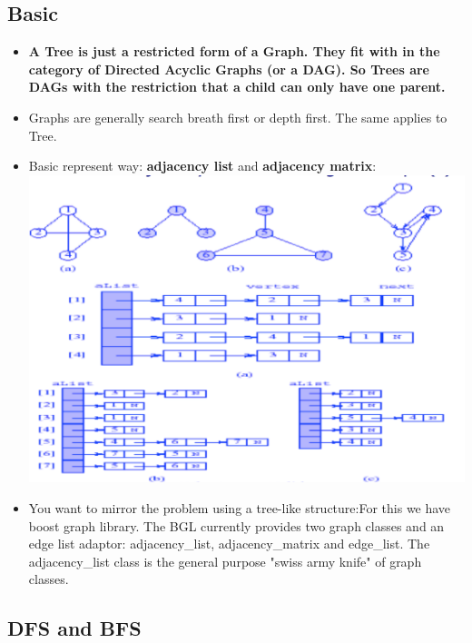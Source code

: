 \documentclass[a4paper,11pt,twoside]{book}
\begin{document}
\subsection{Basic}
\begin{itemize}
\item \textbf{A Tree is just a restricted form of a Graph. They fit with in the category of Directed Acyclic Graphs (or a DAG). So Trees are DAGs with the restriction that a child can only have one parent.}

\item Graphs are generally search breath first or depth first. The same applies to Tree.

\item Basic represent way: \textbf{adjacency list} and \textbf{adjacency matrix}: \newline
\includegraphics[scale=0.6]{pics/adjacency.png} \newline

\item You want to mirror the problem using a tree-like structure:For this we have boost graph library. The BGL currently provides two graph classes and an edge list adaptor: adjacency\_list, adjacency\_matrix and edge\_list.  The adjacency\_list class is the general purpose "swiss army knife" of graph classes.
\end{itemize}

\subsection{DFS and BFS}
\end{document}
